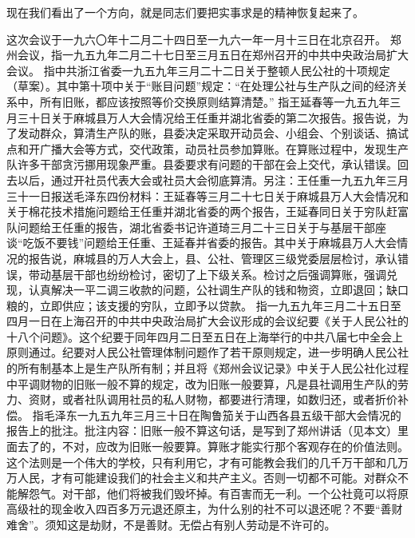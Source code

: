 现在我们看出了一个方向，就是同志们要把实事求是的精神恢复起来了。

\begin{maonote}
这次会议于一九六〇年十二月二十四日至一九六一年一月十三日在北京召开。
郑州会议，指一九五九年二月二十七日至三月五日在郑州召开的中共中央政治局扩大会议。
指中共浙江省委一九五九年三月二十二日关于整顿人民公社的十项规定（草案）。其中第十项中关于“账目问题”规定：“在处理公社与生产队之间的经济关系中，所有旧账，都应该按照等价交换原则结算清楚。”
指王延春等一九五九年三月三十日关于麻城县万人大会情况给王任重并湖北省委的第二次报告。报告说，为了发动群众，算清生产队的账，县委决定采取开动员会、小组会、个别谈话、搞试点和开广播大会等方式，交代政策，动员社员参加算账。在算账过程中，发现生产队许多干部贪污挪用现象严重。县委要求有问题的干部在会上交代，承认错误。回去以后，通过开社员代表大会或社员大会彻底算清。另注：王任重一九五九年三月三十一日报送毛泽东四份材料：王延春等三月二十七日关于麻城县万人大会情况和关于棉花技术措施问题给王任重并湖北省委的两个报告，王延春同日关于穷队赶富队问题给王任重的报告，湖北省委书记许道琦三月二十三日关于与基层干部座谈“吃饭不要钱”问题给王任重、王延春并省委的报告。其中关于麻城县万人大会情况的报告说，麻城县的万人大会上，县、公社、管理区三级党委层层检讨，承认错误，带动基层干部也纷纷检讨，密切了上下级关系。检讨之后强调算账，强调兑现，认真解决一平二调三收款的问题，公社调生产队的钱和物资，立即退回；缺口粮的，立即供应；该支援的穷队，立即予以贷款。
指一九五九年三月二十五日至四月一日在上海召开的中共中央政治局扩大会议形成的会议纪要《关于人民公社的十八个问题》。这个纪要于同年四月二日至五日在上海举行的中共八届七中全会上原则通过。纪要对人民公社管理体制问题作了若干原则规定，进一步明确人民公社的所有制基本上是生产队所有制；并且将《郑州会议记录》中关于人民公社化过程中平调财物的旧账一般不算的规定，改为旧账一般要算，凡是县社调用生产队的劳力、资财，或者社队调用社员的私人财物，都要进行清理，如数归还，或者折价补偿。
指毛泽东一九五九年三月三十日在陶鲁笳关于山西各县五级干部大会情况的报告上的批注。批注内容：旧账一般不算这句话，是写到了郑州讲话（见本文）里面去了的，不对，应改为旧账一般要算。算账才能实行那个客观存在的价值法则。这个法则是一个伟大的学校，只有利用它，才有可能教会我们的几千万干部和几万万人民，才有可能建设我们的社会主义和共产主义。否则一切都不可能。对群众不能解怨气。对干部，他们将被我们毁坏掉。有百害而无一利。一个公社竟可以将原高级社的现金收入四百多万元退还原主，为什么别的社不可以退还呢？不要“善财难舍”。须知这是劫财，不是善财。无偿占有别人劳动是不许可的。
\end{maonote}

